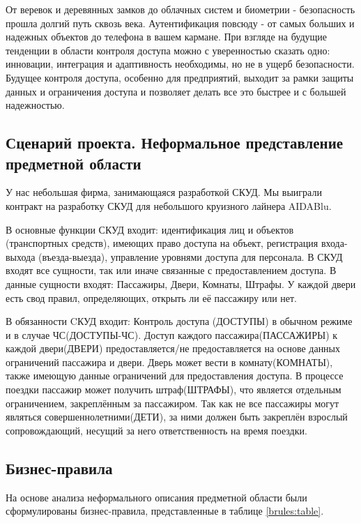 От веревок и деревянных замков до облачных систем и биометрии - безопасность прошла долгий путь сквозь века. Аутентификация повсюду - от самых больших и надежных объектов до телефона в вашем кармане. При взгляде на будущие тенденции в области контроля доступа можно с уверенностью сказать одно: инновации, интеграция и адаптивность необходимы, но не в ущерб безопасности. Будущее контроля доступа, особенно для предприятий, выходит за рамки защиты данных и ограничения доступа и позволяет делать все это быстрее и с большей надежностью.   

\subsection{Сценарий проекта. Неформальное представление предметной области}

У нас небольшая фирма, занимающаяся разработкой СКУД. Мы выиграли контракт на разработку СКУД для небольшого круизного лайнера AIDABlu.

В основные функции СКУД входит: идентификация лиц и объектов (транспортных средств), имеющих право доступа на объект, регистрация входа-выхода (въезда-выезда), управление уровнями доступа для персонала. В СКУД входят все сущности, так или иначе связанные с предоставлением доступа. В данные сущности входят: Пассажиры, Двери, Комнаты, Штрафы. У каждой двери есть свод правил, определяющих, открыть ли её пассажиру или нет.

В обязанности CКУД входит: Контроль доступа (ДОСТУПЫ) в обычном режиме и в случае ЧС(ДОСТУПЫ-ЧС). Доступ каждого пассажира(ПАССАЖИРЫ) к каждой двери(ДВЕРИ) предоставляется/не предоставляется на основе данных ограничений пассажира и двери.  Дверь может вести в комнату(КОМНАТЫ), также имеющую данные ограничений для предоставления доступа. В процессе поездки пассажир может получить штраф(ШТРАФЫ), что является отдельным ограничением, закреплённым за пассажиром. Так как не все пассажиры могут являться совершеннолетними(ДЕТИ), за ними должен быть закреплён взрослый сопровождающий, несущий за него ответственность на время поездки.

\subsection{Бизнес-правила}

На основе анализа неформального описания предметной области были сформулированы бизнес-правила, представленные в таблице  \ref{brules:table}.

